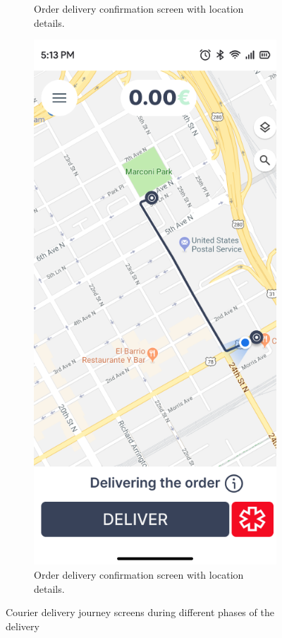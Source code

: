 \begin{figure}[h]
\begin{subfigure}[b]{0.48\textwidth}
        \caption{Order delivery confirmation screen with location details.}
        \label{fig:pickup_order}
    \end{subfigure}
    \hfill
    \begin{subfigure}[b]{0.48\textwidth}
        \centering
        \includegraphics[width=\textwidth]{images/deliver_order_screen.png}
        \caption{Order delivery confirmation screen with location details.}
        \label{fig:deliver_order}
    \end{subfigure}
    \caption{Courier delivery journey screens during different phases of the delivery}
    \label{fig:courier_status}
\end{figure}